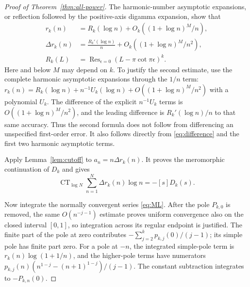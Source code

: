 \documentclass[11pt,a4paper]{article}
\numberwithin{equation}{section}
\theoremstyle{definition}
\theoremstyle{remark}
\DeclareMathOperator{\CT}{CT}
\DeclareMathOperator*{\Res}{Res}
\begin{document}
\begin{proof}[Proof of Theorem~\ref{thm:all-power}]
The harmonic-number asymptotic expansions, or reflection followed by
the positive-axis digamma expansion, show that
\begin{align}
 r_k(n)&=R_k(\log n)+O_k((1+\log n)^M/n),\label{eq:r-asymptotic}\\
 \Delta r_k(n)&=\frac{R_k'(\log n)}n
                  +O_k((1+\log n)^M/n^2),\label{eq:delta-asymptotic}\\
 R_k(L)&=\Res_{\epsilon=0}(L-\pi\cot\pi\epsilon)^k.
 \label{eq:Rdefinition}
\end{align}
Here and below $M$ may depend on $k$.  To justify the second estimate,
use the complete harmonic asymptotic expansions through the $1/n$
term: $r_k(n)=R_k(\log n)+n^{-1}U_k(\log n)
+O((1+\log n)^M/n^2)$ with a polynomial $U_k$.  The difference of
the explicit $n^{-1}U_k$ terms is $O((1+\log n)^M/n^2)$, and
the leading difference is $R_k'(\log n)/n$ to that same accuracy.
Thus the second formula does not follow from differencing an
unspecified first-order error.  It also follows directly from
\eqref{eq:difference} and the first two harmonic asymptotic terms.

Apply Lemma~\ref{lem:cutoff} to $a_n=n\Delta r_k(n)$.
It proves the meromorphic continuation of $D_k$ and gives
\begin{equation}
 \CT_{\log N}\sum_{n=1}^N\Delta r_k(n)\log n=-[s]D_k(s).
 \label{eq:delta-cutoff}
\end{equation}

Now integrate the normally convergent series \eqref{eq:ML}.
After the pole $P_{k,0}$ is removed, the same
$O(n^{-j-1})$ estimate proves uniform convergence also on the
closed interval $[0,1]$, so integration across its regular
endpoint is justified.
The finite part of the pole at zero contributes
$-\sum_{j=2}^kp_{k,j}(0)/(j-1)$; its simple pole has finite part
zero.  For a pole at $-n$, the integrated simple-pole term is
$r_k(n)\log(1+1/n)$, and the higher-pole terms have numerators
$p_{k,j}(n)(n^{1-j}-(n+1)^{1-j})/(j-1)$.
The constant subtraction integrates to $-P_{k,n}(0)$.


\end{proof}
\end{document}
